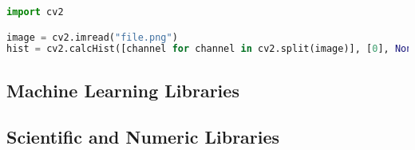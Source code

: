 \begin{lstlisting}[language=python, caption={Creating a Histogram in OpenCV cv2},
label=lst:cv2-hist, breaklines=true, frame=single]
import cv2

image = cv2.imread("file.png")
hist = cv2.calcHist([channel for channel in cv2.split(image)], [0], None, [255,255,255], [0,255,0,255,0,255])
\end{lstlisting}



\subsection{Machine Learning Libraries}

\subsection{Scientific and Numeric Libraries}


